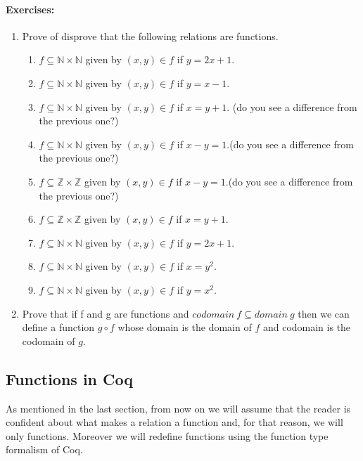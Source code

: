 \paragraph{\bf Exercises:}
\begin{enumerate}
\item Prove of disprove that the following relations are functions.
\begin{enumerate}
	\item $f\subseteq \mathbb{N}\times \mathbb{N}$ given by $(x,y)\in f$ if $y = 2x+1$.
	\item $f\subseteq \mathbb{N}\times \mathbb{N}$ given by $(x,y)\in f$ if $y = x-1$.

	\item $f\subseteq \mathbb{N}\times \mathbb{N}$ given by $(x,y)\in f$ if $x = y+1$. (do you see a difference from the previous one?)
	\item $f\subseteq \mathbb{N}\times \mathbb{N}$ given by $(x,y)\in f$ if $x-y = 1$.(do you see a difference from the previous one?)
	\item $f\subseteq \mathbb{Z}\times \mathbb{Z}$ given by $(x,y)\in f$ if $x-y = 1$.(do you see a difference from the previous one?)
	 \item $f\subseteq \mathbb{Z}\times \mathbb{Z}$ given by $(x,y)\in f$ if $x = y+1$.
	\item $f\subseteq \mathbb{N}\times \mathbb{N}$ given by $(x,y)\in f$ if $y = 2x+1$.
	\item $f\subseteq \mathbb{N}\times \mathbb{N}$ given by $(x,y)\in f$ if $x = y^2$.
	 \item $f\subseteq \mathbb{N}\times \mathbb{N}$ given by $(x,y)\in f$ if $y = x^2$.
\end{enumerate}
\item Prove that if f and g are functions and $codomain \ f\subseteq domain \ g$ then we can define a function $g\circ f $ whose domain is the domain of $f$ and codomain is the codomain of $g$.
\end{enumerate}



  \subsection{Functions in Coq}\label{subsec:fuctions in coq}
  
  As mentioned in the last section, from now on we will assume that the reader is confident about what makes a relation a function and, for that reason, we will only functions. Moreover we will redefine functions using the function type formalism of Coq.
  
